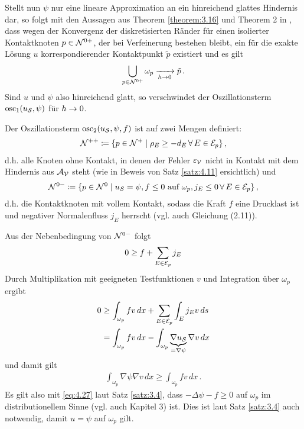 Stellt nun $\psi$ nur eine lineare Approximation an ein hinreichend glattes Hindernis dar, so folgt mit den Aussagen aus Theorem  \ref{theorem:3.16} und Theorem 2 in \cite{Zhang}, dass wegen der Konvergenz der diskretisierten Ränder für einen isolierter Kontaktknoten $p \in \mathcal N^{0+}$, der bei
Verfeinerung bestehen bleibt, ein für die exakte Lösung $u$ korrespondierender Kontaktpunkt $\tilde p$ existiert und es gilt
\begin{align*}
	\bigcup_{p \in \mathcal N^{0+}} \omega_p \xrightarrow[h\rightarrow 0]{} \tilde p \, .
\end{align*}
Sind $u$ und $\psi$ also hinreichend glatt, so verschwindet der Oszillationsterm $\operatorname{osc}_1(u_{\mathcal S},\psi)$ für $h\rightarrow 0$.



Der Oszillationsterm $\operatorname{osc}_2(u_{\mathcal S}, \psi, f)$ ist auf zwei Mengen definiert:
\begin{align}\label{eq:4.25}
	\mathcal N^{++} \coloneqq \{p \in \mathcal N^{+}\mid \rho_E \ge - d_E \, \forall \, E \in \mathcal E_p\} \, ,
\end{align}
d.h. alle Knoten ohne Kontakt, in denen der Fehler $\varepsilon_{\mathcal V}$ nicht in Kontakt mit dem Hindernis aus $\mathcal A_{\mathcal V}$ steht (wie in Beweis von Satz \ref{satz:4.11} ersichtlich) und
\begin{align}\label{eq:4.26}
	\mathcal N^{0-}\coloneqq \{ p \in \mathcal N^0 \mid u_{\mathcal S} = \psi , f \le 0 \text{ auf } \omega_p, j_E \le 0 \, \forall \, E \in \mathcal E_p \} \, ,
\end{align}
d.h. die Kontaktknoten mit vollem Kontakt, sodass die Kraft $f$ eine Drucklast ist und negativer Normalenfluss $j_E$ herrscht (vgl. auch \cite{SiebVee} Gleichung (2.11)).


Aus der Nebenbedingung von $\mathcal N^{0-}$ folgt
\begin{align*}
	0 \ge f + \sum_{E \in \mathcal E_p} j_E
\end{align*}
Durch Multiplikation mit geeigneten Testfunktionen $v$ und Integration über $\omega_p$ ergibt
\begin{align*}
	0 &  \ge \int_{\omega_p} f v \, dx + \sum_{E\in \mathcal E_p} \int_E j_E v \, ds \\
	& = \int_{\omega_p} f v \, dx - \int_{\omega_p} \underbrace{\nabla u_{\mathcal S}}_{=\nabla \psi} \nabla v \, dx
\end{align*}
und damit gilt
\begin{align}\label{eq:4.27}
	 \int_{\omega_p} {\nabla \psi} \nabla v \, dx \ge \int_{\omega_p} f v \, dx \, .
\end{align}
Es gilt also mit \eqref{eq:4.27} laut Satz \ref{satz:3.4}, dass $-\Delta \psi - f \ge 0$ auf $\omega_p$ im distributionellem Sinne (vgl. auch \cite{Walker} Kapitel 3) ist. Dies ist laut Satz \ref{satz:3.4} auch notwendig, damit $u = \psi$ auf $\omega_p$ gilt.



